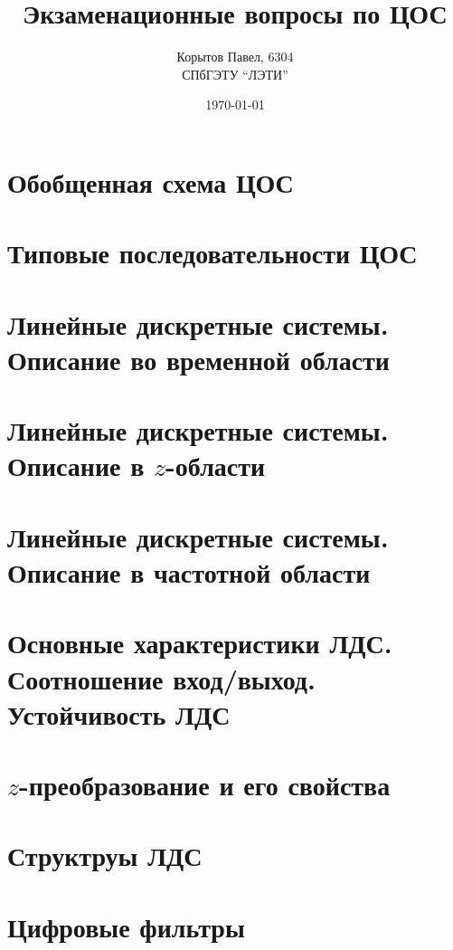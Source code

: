\documentclass[a4paper, 14pt]{extarticle}
\title{Экзаменационные вопросы по ЦОС}
\author{Корытов Павел, 6304 \\ СПбГЭТУ \enquote{ЛЭТИ}}
\date{\today}
\begin{document}
\maketitle

\tableofcontents{}

\section{Обобщенная схема ЦОС}
\lipsum[1] %

\section{Типовые последовательности ЦОС}
\lipsum[1] %

\section{Линейные дискретные системы. Описание во временной области}
\lipsum[1] %

\section{Линейные дискретные системы. Описание в $z$-области}
\lipsum[1] %

\section{Линейные дискретные системы. Описание в частотной области}
\lipsum[1] %

\section{Основные характеристики ЛДС. Соотношение вход/выход. Устойчивость ЛДС}
\lipsum[1] %

\section{$z$-преобразование и его свойства}
\lipsum[1] %

\section{Структруы ЛДС}
\lipsum[1] %

\section{Цифровые фильтры}
\lipsum[1] %
\end{document}
